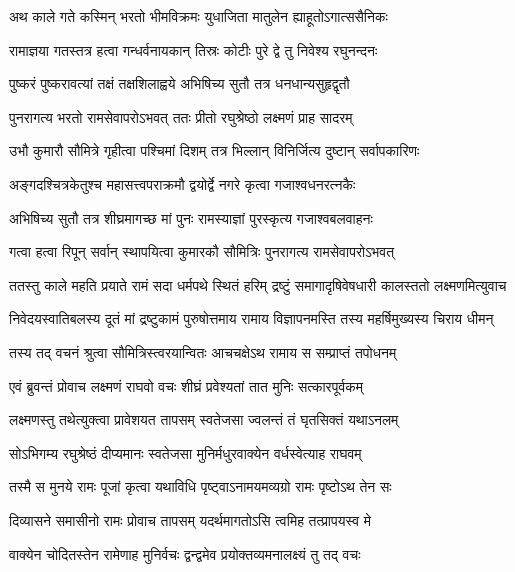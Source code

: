 

\twolineshloka
{अथ काले गते कस्मिन् भरतो भीमविक्रमः}
{युधाजिता मातुलेन ह्याहूतोऽगात्ससैनिकः} %

\twolineshloka
{रामाज्ञया गतस्तत्र हत्वा गन्धर्वनायकान्}
{तिस्रः कोटीः पुरे द्वे तु निवेश्य रघुनन्दनः} %

\twolineshloka
{पुष्करं पुष्करावत्यां तक्षं तक्षशिलाह्वये}
{अभिषिच्य सुतौ तत्र धनधान्यसुहृद्वृतौ} %

\twolineshloka
{पुनरागत्य भरतो रामसेवापरोऽभवत्}
{ततः प्रीतो रघुश्रेष्ठो लक्ष्मणं प्राह सादरम्} %

\twolineshloka
{उभौ कुमारौ सौमित्रे गृहीत्वा पश्चिमां दिशम्}
{तत्र भिल्लान् विनिर्जित्य दुष्टान् सर्वापकारिणः} %

\twolineshloka
{अङ्गदश्चित्रकेतुश्च महासत्त्वपराक्रमौ}
{द्वयोर्द्वे नगरे कृत्वा गजाश्वधनरत्नकैः} %

\twolineshloka
{अभिषिच्य सुतौ तत्र शीघ्रमागच्छ मां पुनः}
{रामस्याज्ञां पुरस्कृत्य गजाश्वबलवाहनः} %

\twolineshloka
{गत्वा हत्वा रिपून् सर्वान् स्थापयित्वा कुमारकौ}
{सौमित्रिः पुनरागत्य रामसेवापरोऽभवत्} %

\fourlineindentedshloka
{ततस्तु काले महति प्रयाते}
{रामं सदा धर्मपथे स्थितं हरिम्}
{द्रष्टुं समागादृषिवेषधारी}
{कालस्ततो लक्ष्मणमित्युवाच} %

\fourlineindentedshloka
{निवेदयस्वातिबलस्य दूतं}
{मां द्रष्टुकामं पुरुषोत्तमाय}
{रामाय विज्ञापनमस्ति तस्य}
{महर्षिमुख्यस्य चिराय धीमन्} %

\twolineshloka
{तस्य तद् वचनं श्रुत्वा सौमित्रिस्त्वरयान्वितः}
{आचचक्षेऽथ रामाय स सम्प्राप्तं तपोधनम्} %

\twolineshloka
{एवं ब्रुवन्तं प्रोवाच लक्ष्मणं राघवो वचः}
{शीघ्रं प्रवेश्यतां तात मुनिः सत्कारपूर्वकम्} %

\twolineshloka
{लक्ष्मणस्तु तथेत्युक्त्वा प्रावेशयत तापसम्}
{स्वतेजसा ज्वलन्तं तं घृतसिक्तं यथाऽनलम्} %

\twolineshloka
{सोऽभिगम्य रघुश्रेष्ठं दीप्यमानः स्वतेजसा}
{मुनिर्मधुरवाक्येन वर्धस्वेत्याह राघवम्} %

\twolineshloka
{तस्मै स मुनये रामः पूजां कृत्वा यथाविधि}
{पृष्ट्वाऽनामयमव्यग्रो रामः पृष्टोऽथ तेन सः} %

\twolineshloka
{दिव्यासने समासीनो रामः प्रोवाच तापसम्}
{यदर्थमागतोऽसि त्वमिह तत्प्रापयस्व मे} %

\twolineshloka
{वाक्येन चोदितस्तेन रामेणाह मुनिर्वचः}
{द्वन्द्वमेव प्रयोक्तव्यमनालक्ष्यं तु तद् वचः} %

